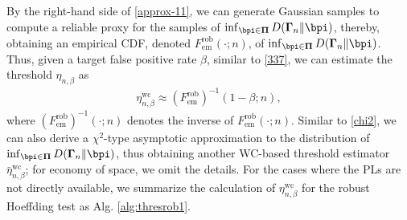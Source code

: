 \documentclass[10pt, twocolumn]{IEEEtran}
\begin{document}
By the right-hand side of \eqref{approx-11}, we can generate Gaussian
samples to compute a reliable proxy for the samples of $\mathop {\inf
}_{\bpi \in \boldsymbol{\Pi} } D( {{\boldsymbol{\Gamma} _n}\| \bpi } )$,
thereby, obtaining an empirical CDF, denoted ${F^{\text{rob}}_{\text{em}}}( \cdot ; n
)$, of $\mathop {\inf }_{\bpi \in \boldsymbol{\Pi} } D(
{{\boldsymbol{\Gamma} _n}\| \bpi } )$. Thus, given a target false
positive rate {$\beta$}, similar to \eqref{337}, we can estimate the
threshold $\eta_{n,\beta}$ as
\begin{align}
\eta_{n,\beta}^{\text{wc}}  \approx (F_{\text{em}}^{\text{rob}})^{ - 1}( {1 - {\beta}}; n ),
\label{eta-wc-rob}
\end{align}
where $(F_{\text{em}}^{\text{rob}})^{ - 1}( \cdot ; n )$ denotes the inverse of
${F^{\text{rob}}_{\text{em}}}( \cdot ; n )$. {Similar to \eqref{chi2}, we can also derive a $\chi^2$-type asymptotic approximation to the distribution of $\mathop {\inf }\nolimits_{\bpi  \in \boldsymbol{\Pi} } D( {{\boldsymbol{\Gamma} _n}\| \bpi  } ) $, thus obtaining another WC-based threshold estimator $\bar \eta_{n,\beta}^{\text{wc}} $; for economy of space, we omit the details.} For the cases where the PLs are not directly available, we summarize the calculation of $\eta_{n,\beta}^{\text{wc}} $ for the robust Hoeffding test as
Alg. \ref{alg:thresrob1}.
\end{document}
